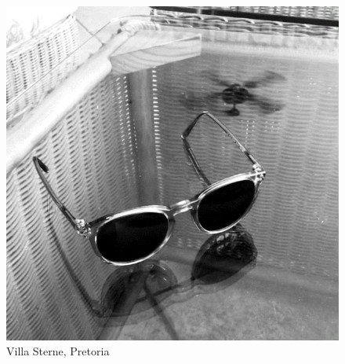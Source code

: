 \documentclass[
  letterpaper,
]{book}
\begin{document}
\begin{figure}
\begin{minipage}[t]{0.50\linewidth}
{{\includegraphics{Specs.jpg}

}

\caption{Villa Sterne, Pretoria}

}

\end{minipage}%
%
\begin{minipage}[t]{0.50\linewidth}

{\centering 

}
\end{minipage}
\end{figure}
\end{document}
